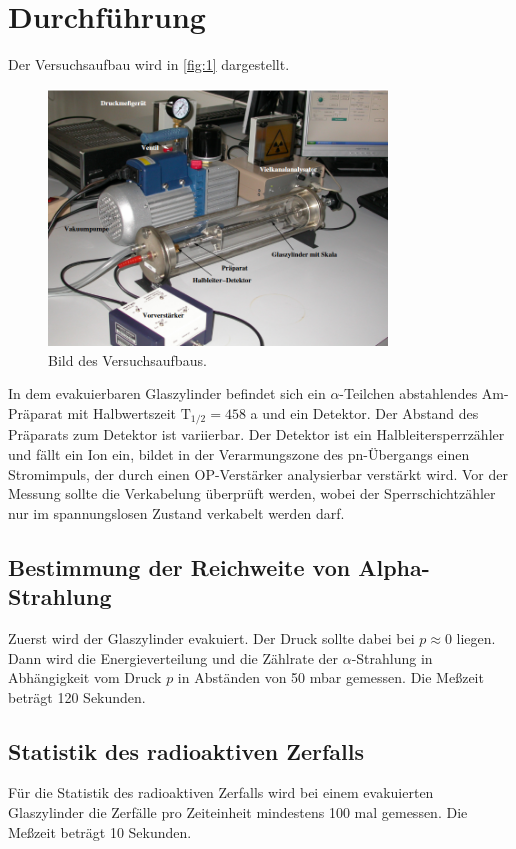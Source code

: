 \section{Durchführung}
Der Versuchsaufbau wird in \autoref{fig:1} dargestellt.
\begin{figure}[H]
  \centering
  \includegraphics[width=9cm]{content/aufbau}
  \caption{Bild des Versuchsaufbaus.}
  \label{fig:1}
\end{figure} 
In dem evakuierbaren Glaszylinder befindet sich ein $\alpha$-Teilchen abstahlendes Am-Präparat mit Halbwertszeit $\textrm{T}_{1/2}=458$ a und ein Detektor. Der Abstand des Präparats zum Detektor ist variierbar. Der Detektor ist ein Halbleitersperrzähler und fällt ein Ion ein, bildet in der Verarmungszone des pn-Übergangs einen Stromimpuls, der durch einen OP-Verstärker analysierbar verstärkt wird. Vor der Messung sollte die Verkabelung überprüft werden, wobei der Sperrschichtzähler nur im spannungslosen Zustand verkabelt werden darf.

\subsection{Bestimmung der Reichweite von Alpha-Strahlung}
Zuerst wird der Glaszylinder evakuiert. Der Druck sollte dabei bei $p\approx 0$ liegen. Dann wird die Energieverteilung und die Zählrate der $\alpha$-Strahlung in Abhängigkeit vom Druck $p$ in Abständen von 50 mbar gemessen. Die Meßzeit beträgt 120 Sekunden. 

\subsection{Statistik des radioaktiven Zerfalls}
Für die Statistik des radioaktiven Zerfalls wird bei einem evakuierten Glaszylinder die Zerfälle pro Zeiteinheit mindestens 100 mal gemessen. Die Meßzeit beträgt 10 Sekunden. 
